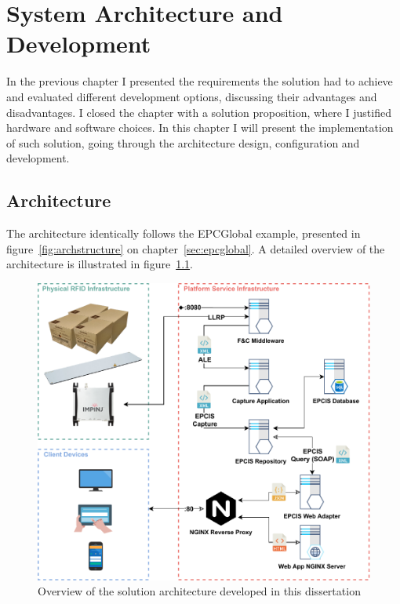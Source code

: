 \chapter{System Architecture and Development} \label{sec:systemdevelopment}

In the previous chapter I presented the requirements the solution had to achieve and evaluated different development options, discussing their advantages and disadvantages.
I closed the chapter with a solution proposition, where I justified hardware and software choices.
In this chapter I will present the implementation of such solution, going through the architecture design, configuration and development. 

\section{Architecture}

The architecture identically follows the EPCGlobal example, presented in figure~\ref{fig:archstructure} on chapter~\ref{sec:epcglobal}.
A detailed overview of the architecture is illustrated in figure~\ref{fig:practicalarchitecture}.

\begin{figure}
    \centering
    \includegraphics[width=\textwidth]{figs/platform_diagram.pdf}
    \caption{Overview of the solution architecture developed in this dissertation} 
    \label{fig:practicalarchitecture}
\end{figure}

